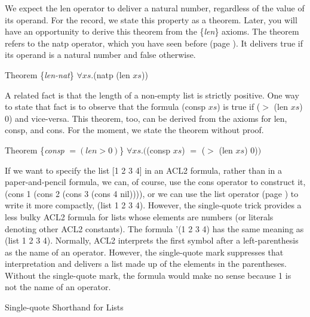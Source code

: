 We expect the len operator to deliver a natural number,
regardless of the value of its operand.
For the record, we state this property as a theorem.
Later, you will have an opportunity to derive
this theorem from the \{\emph{len}\} axioms.
The theorem refers to the natp operator,
which you have seen before (page \pageref{natp-op}).
It delivers true if its operand is a natural number and false otherwise.
\begin{samepage}
\label{len-nat-thm}
\begin{center}
Theorem \{\emph{len-nat}\} $\forall xs.$(natp (len $xs$))
\end{center}
\end{samepage}

A related fact is that the length of a non-empty list is strictly positive.
One way to state that fact is to observe that the formula (consp $xs$) is true
if ($>$ (len $xs$) 0) and vice-versa. %
This theorem, too, can be derived from the axioms for
len, consp, and cons. For the moment,
we state the theorem without proof.
\begin{samepage}
\label{consp-len-thm}
\begin{center}
Theorem \{\emph{consp} $= (len > 0)$\} $\forall xs.($(consp $xs$) $=$ ($>$ (len $xs$) 0)$)$
\end{center}
\end{samepage}

\begin{aside}
If we want to specify the list [1 2 3 4] in an ACL2 formula,
rather than in a paper-and-pencil formula,
we can, of course, use the cons operator to construct it,
(cons 1 (cons 2 (cons 3 (cons 4 nil)))),
or we can use the list operator (page \pageref{list-op-informal}) to write it more compactly,
(list 1 2 3 4).
However, the single-quote trick provides a less bulky ACL2 formula for lists
whose elements are numbers (or literals denoting other ACL2 constants).
The formula
'(1 2 3 4) has the same meaning as (list 1 2 3 4).
Normally, ACL2 interprets the first symbol after a left-parenthesis
as the name of an operator.
However, the single-quote mark suppresses that interpretation and
delivers a list made up of the elements in the parentheses.
Without the single-quote mark,
the formula would make no sense because 1 is not the name of an operator.
\caption{Single-quote Shorthand for Lists}
\label{acl2-single-quote}
\end{aside}

